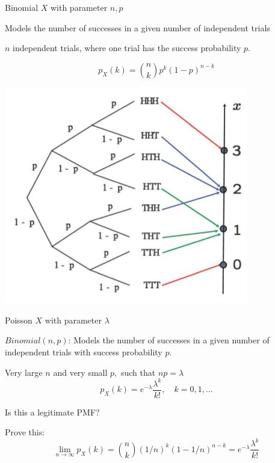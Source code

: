 \documentclass[handout,fleqn,aspectratio=169]{beamer}
\begin{document}
\begin{frame}{Binomial $X$ with parameter $n,p$}

{
\plitemsep 0.1in
\bci 
\item<2-> Models the number of successes in a given number of independent trials
\item<3-> $n$ independent trials, where one trial has the success probability $p.$

$$
p_X(k) = {n \choose k} p^k (1-p)^{n-k}
$$
\eci 
}
{
\centering
\includegraphics[width=0.8\textwidth]{L6_binomial_ex.png}
}
\end{frame}

\begin{frame}{Poisson $X$ with parameter $\lambda$}


\plitemsep 0.05in
\bci 
\item<2-> $Binomial(n,p)$: Models the number of successes in a given number of independent trials with success probability $p.$

\item<3-> Very large $n$ and very small $p,$ such that $np =\lambda$
$$
p_X(k) = e^{-\lambda}\frac{\lambda^k}{k!}, \quad k=0,1, \ldots
$$

\item<4-> Is this a legitimate PMF?

\item<5-> Prove this:
$$
\lim_{n \rightarrow \infty} p_X(k) = {n \choose k} (1/n)^k (1-1/n)^{n-k} = e^{-\lambda}\frac{\lambda^k}{k!}
$$


\eci 

\end{frame}
\end{document}
